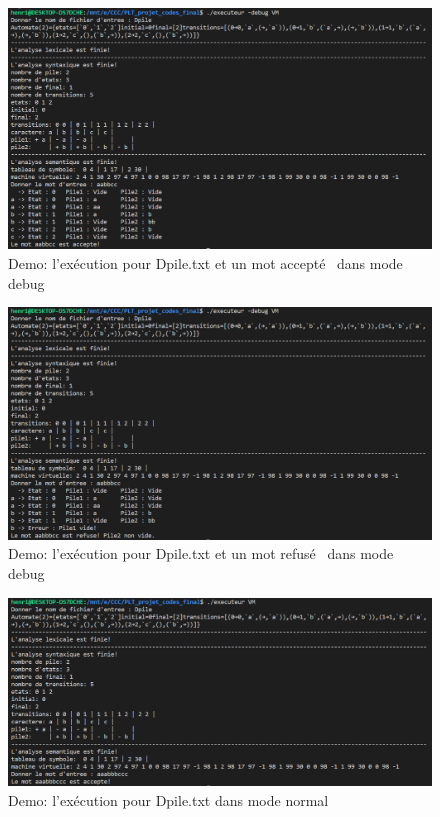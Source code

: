 \documentclass[a4paper,14pt,UTF8]{article}
\begin{document}
	\begin{figure}[H]
		\setlength{\abovecaptionskip}{-0.cm}
		
		\begin{center}
			\includegraphics[width=16cm]{executeur1}
		\end{center}
		\caption{Demo: l'exécution pour Dpile.txt et un mot accepté \ dans mode debug}
	\end{figure}

	\begin{figure}[H]
	\setlength{\abovecaptionskip}{-0.cm}
	
	\begin{center}
		\includegraphics[width=16cm]{executeur2}
	\end{center}
	\caption{Demo: l'exécution pour Dpile.txt et un mot refusé \ dans mode debug}
	\end{figure}

	\begin{figure}[H]
	\setlength{\abovecaptionskip}{-0.cm}
	
	\begin{center}
		\includegraphics[width=16cm]{executeur3}
	\end{center}
	\caption{Demo: l'exécution pour Dpile.txt dans mode normal}
	\end{figure}
\end{document}
